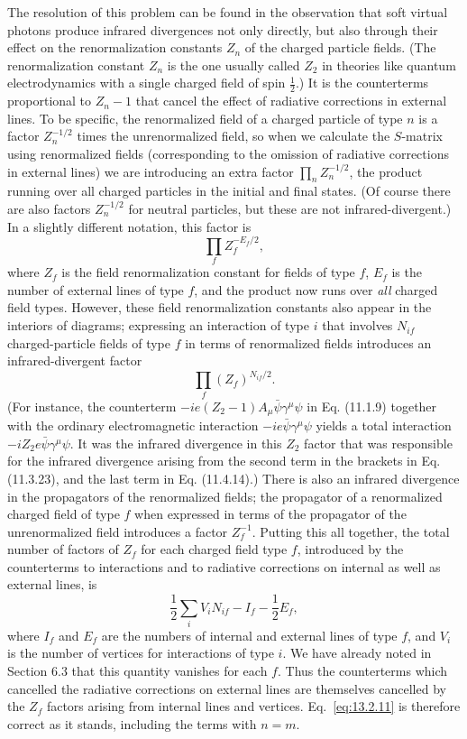 The resolution of this problem can be found in the observation that soft
virtual photons produce infrared divergences not only directly, but also
through their effect on the renormalization constants $Z_n$ of the charged
particle fields. (The renormalization constant $Z_n$ is the one usually called
$Z_2$ in theories like quantum electrodynamics with a single charged field
of spin $\tfrac12$.) It is the counterterms proportional to $Z_n-1$ that cancel
the effect of radiative corrections in external lines. To be specific, the
renormalized field of a charged particle of type $n$ is a factor $Z_n^{-1/2}$
times the unrenormalized field, so when we calculate the $S$-matrix using
renormalized fields (corresponding to the omission of radiative corrections
in external lines) we are introducing an extra factor $\prod_n Z_n^{-1/2}$, the product
running over all charged particles in the initial and final states. (Of
course there are also factors $Z_n^{-1/2}$ for neutral particles, but these are not
infrared-divergent.) In a slightly different notation, this factor is
\[
  \prod_f Z_f^{-E_f/2},
\]
where $Z_f$ is the field renormalization constant for fields of type $f$, $E_f$ is
the number of external lines of type $f$, and the product now runs over \emph{all}
charged field types. However, these field renormalization constants also
appear in the interiors of diagrams; expressing an interaction of type $i$
that involves $N_{if}$ charged-particle fields of type $f$ in terms of renormalized
fields introduces an infrared-divergent factor
\[
  \prod_f(Z_f)^{N_{if}/2}.
\]
(For instance, the counterterm $-ie(Z_2-1)A_\mu\bar\psi\gamma^\mu\psi$ in Eq. (11.1.9) together
with the ordinary electromagnetic interaction $-ie\bar\psi\gamma^\mu\psi$ yields a total
interaction $-iZ_2e\bar\psi\gamma^\mu\psi$. It was the infrared divergence in this $Z_2$ factor that
was responsible for the infrared divergence arising from the second term
in the brackets in Eq. (11.3.23), and the last term in Eq. (11.4.14).) There is
also an infrared divergence in the propagators of the renormalized fields;
the propagator of a renormalized charged field of type $f$ when expressed
in terms of the propagator of the unrenormalized field introduces a factor
$Z_f^{-1}$. Putting this all together, the total number of factors of $Z_f$ for each
charged field type $f$, introduced by the counterterms to interactions and
to radiative corrections on internal as well as external lines, is
\[
  \frac12\sum_i V_iN_{if}-I_f-\frac12E_f,
\]
where $I_f$ and $E_f$ are the numbers of internal and external lines of type
$f$, and $V_i$ is the number of vertices for interactions of type $i$. We have
already noted in Section 6.3 that this quantity vanishes for each $f$. Thus
the counterterms which cancelled the radiative corrections on external
lines are themselves cancelled by the $Z_f$ factors arising from internal lines
and vertices. Eq.~\eqref{eq:13.2.11} is therefore correct as it stands, including the
terms with $n=m$.
